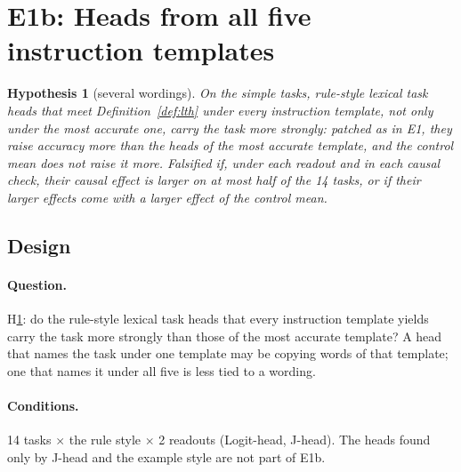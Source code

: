 \documentclass[11pt,a4paper]{article}
\newtheorem{hypothesis}{Hypothesis}
\begin{document}
\section{E1b: Heads from all five instruction templates}\label{sec:consensus}

\begin{hypothesis}[several wordings]\label{h:consensus}
On the simple tasks, rule-style lexical task heads that meet Definition~\ref{def:lth} under every instruction template, not only under the most accurate one, carry the task more strongly: patched as in E1, they raise accuracy more than the heads of the most accurate template, and the control mean does not raise it more. \emph{Falsified} if, under each readout and in each causal check, their causal effect is larger on at most half of the 14 tasks, or if their larger effects come with a larger effect of the control mean.
\end{hypothesis}

\subsection{Design}
\paragraph{Question.} H\ref{h:consensus}: do the rule-style lexical task heads that every instruction template yields carry the task more strongly than those of the most accurate template? A head that names the task under one template may be copying words of that template; one that names it under all five is less tied to a wording.

\paragraph{Conditions.} 14 tasks $\times$ the rule style $\times$ 2 readouts (Logit-head, J-head). The heads found only by J-head and the example style are not part of E1b.
\end{document}

